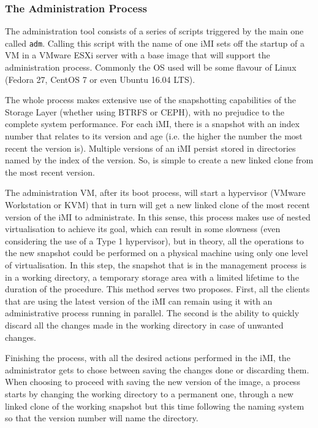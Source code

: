 \subsubsection{The Administration Process}
\label{subsub:admin_imi}

The administration tool consists of a series of scripts triggered by the main one called \texttt{adm}. Calling this script with the name of one iMI sets off the startup of a VM in a VMware ESXi server with a base image that will support the administration process. Commonly the OS used will be some flavour of Linux (Fedora 27, CentOS 7 or even Ubuntu 16.04 LTS).

The whole process makes extensive use of the snapshotting capabilities of the Storage Layer (whether using BTRFS or CEPH), with no prejudice to the complete system performance. For each iMI, there is a snapshot with an index number that relates to its version and age (i.e. the higher the number the most recent the version is). Multiple versions of an iMI persist stored in directories named by the index of the version. So, is simple to create a new linked clone from the most recent version.

The administration VM, after its boot process, will start a hypervisor (VMware Workstation or KVM) that in turn will get a new linked clone of the most recent version of the iMI to administrate. In this sense, this process makes use of nested virtualisation to achieve its goal, which can result in some slowness (even considering the use of a Type 1 hypervisor), but in theory, all the operations to the new snapshot could be performed on a physical machine using only one level of virtualisation. 
In this step, the snapshot that is in the management process is in a working directory, a temporary storage area with a limited lifetime to the duration of the procedure. This method serves two proposes. First, all the clients that are using the latest version of the iMI can remain using it with an administrative process running in parallel. The second is the ability to quickly discard all the changes made in the working directory in case of unwanted changes.

Finishing the process, with all the desired actions performed in the iMI, the administrator gets to chose between saving the changes done or discarding them. When choosing to proceed with saving the new version of the image, a process starts by changing the working directory to a permanent one, through a new linked clone of the working snapshot but this time following the naming system so that the version number will name the directory.


